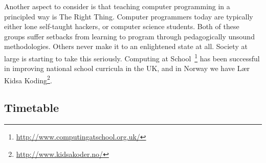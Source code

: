 Another aspect to consider is that teaching computer programming in a 
principled way is The Right Thing. Computer programmers today are typically 
either lone self-taught hackers, or computer science students. Both of these 
groups suffer setbacks from learning to program through pedagogically unsound 
methodologies. Others never make it to an enlightened state at all. Society at 
large is starting to take this seriously. Computing at 
School~\footnote{\url{http://www.computingatschool.org.uk/}} has been 
successful in improving national school curricula in the UK, and in Norway we 
have Lær Kidsa Koding\footnote{\url{http://www.kidsakoder.no/}}.

\subsection{Timetable}
